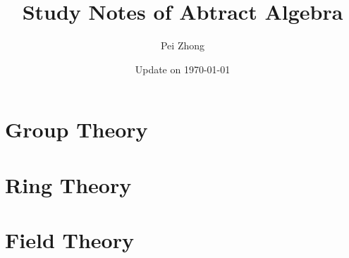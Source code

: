 \documentclass[12pt,oneside]{book} %
\begin{document}
\title{\bf \huge Study Notes of Abtract Algebra}
\author{Pei Zhong}
\date{Update on \today}

\maketitle


\tableofcontents

\begin{spacing}{1}











\part{Group Theory}













\part{Ring Theory}







\part{Field Theory}









\end{spacing}
\end{document}
